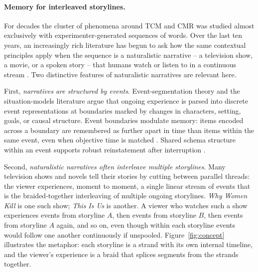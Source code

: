 \documentclass[10pt]{article}
\begin{document}
\paragraph{Memory for interleaved storylines.}
For decades the cluster of phenomena around TCM and CMR was studied
almost exclusively with experimenter-generated sequences of words.
Over the last ten years, an increasingly rich literature has begun to
ask how the same contextual principles apply when the sequence is a
naturalistic narrative -- a television show, a movie, or a spoken story
-- that humans watch or listen to in a continuous stream
\citep{BaldEtal17,ZadbEtal17,HeusMann18}. Two distinctive features of
naturalistic narratives are relevant here.

First, \emph{narratives are structured by events}. Event-segmentation
theory \citep{ZacSpeSwaBraRey07} and the situation-models literature
\citep{ZwaaRadv98} argue that ongoing experience is parsed into discrete
event representations at boundaries marked by changes in characters,
setting, goals, or causal structure. Event boundaries modulate
memory: items encoded across a boundary are remembered as further
apart in time than items within the same event, even when objective
time is matched \citep{EzzaDav11,HeusMann18}. Shared schema structure
within an event supports robust reinstatement after interruption
\citep{BaldEtal18}.

Second, \emph{naturalistic narratives often interleave multiple
storylines}. Many television shows and novels tell their stories by
cutting between parallel threads: the viewer experiences, moment to
moment, a single linear stream of events that is the braided-together
interleaving of multiple ongoing storylines. \emph{Why Women Kill} is
one such show; \emph{This Is Us} is another. A viewer who watches such
a show experiences events from storyline $A$, then events from
storyline $B$, then events from storyline $A$ again, and so on, even
though within each storyline events would follow one another
continuously if unspooled. Figure~\ref{fig:concept} illustrates the
metaphor: each storyline is a strand with its own internal timeline,
and the viewer's experience is a braid that splices segments from the
strands together.
\end{document}
